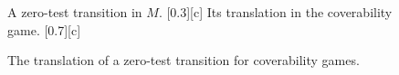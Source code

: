 \documentclass[../../diss.tex]{subfiles}
\begin{document}
\begin{figure}[t]
    {%
        \centering%
        \subcaptionbox%
        {%
            A zero-test transition in $M$.%
            \label{Figure:ValenceCoverabilityGamesZerotestOriginal}%
        }[0.3\textwidth][c]%
        {%
        }%
    }%
    {%
    \centering%
    \subcaptionbox%
        {%
            Its translation in the coverability game.%
            \label{Figure:ValenceCoverabilityGamesZerotestTranslation}%
        }[0.7\textwidth][c]%
        {%
        }%
    }%
    \caption{The translation of a zero-test transition for coverability games.}%
    \label{Figure:ValenceCoverabilityGamesZerotest}%
\end{figure}
\end{document}
